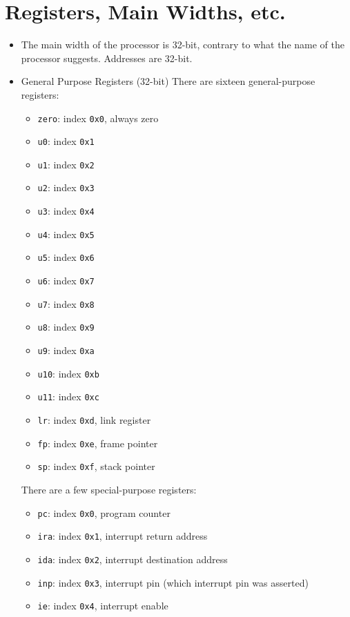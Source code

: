 \documentclass{article}
\begin{document}
\section{Registers, Main Widths, etc.}
	\begin{itemize}
	\item The main width of the processor is 32-bit, contrary to what the
		name of the processor suggests.  Addresses are 32-bit. 
	\item General Purpose Registers (32-bit)
		There are sixteen general-purpose registers:
		\begin{itemize}
		\item \texttt{zero}: index \texttt{0x0}, always zero
		\item \texttt{u0}: index \texttt{0x1}
		\item \texttt{u1}: index \texttt{0x2}
		\item \texttt{u2}: index \texttt{0x3}
		\item \texttt{u3}: index \texttt{0x4}
		\item \texttt{u4}: index \texttt{0x5}
		\item \texttt{u5}: index \texttt{0x6}
		\item \texttt{u6}: index \texttt{0x7}
		\item \texttt{u7}: index \texttt{0x8}
		\item \texttt{u8}: index \texttt{0x9}
		\item \texttt{u9}: index \texttt{0xa}
		\item \texttt{u10}: index \texttt{0xb}
		\item \texttt{u11}: index \texttt{0xc}
		\item \texttt{lr}: index \texttt{0xd}, link register
		\item \texttt{fp}: index \texttt{0xe}, frame pointer
		\item \texttt{sp}: index \texttt{0xf}, stack pointer
		\end{itemize}

		There are a few special-purpose registers:
		\begin{itemize}
		\item \texttt{pc}: index \texttt{0x0}, program counter
		\item \texttt{ira}: index \texttt{0x1}, interrupt return address
		\item \texttt{ida}: index \texttt{0x2}, interrupt destination
			address
		\item \texttt{inp}: index \texttt{0x3}, interrupt pin (which
			interrupt pin was asserted)
		\item \texttt{ie}: index \texttt{0x4}, interrupt enable
		\end{itemize}
	\end{itemize}
\end{document}
